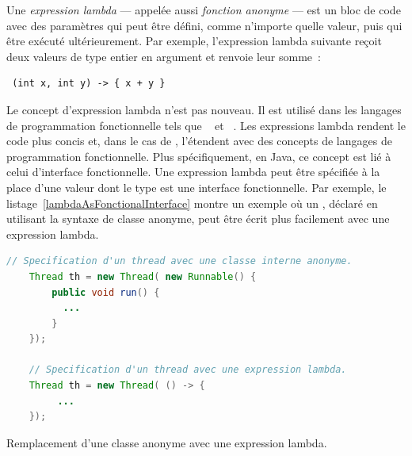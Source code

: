 Une \emph{expression lambda} ---  appel\'ee aussi \emph{fonction anonyme} --- est un bloc de code avec des param\`etres qui peut \^etre d\'efini, comme n'importe quelle valeur, puis qui \^etre ex\'ecut\'e ult\'erieurement. Par exemple, l'expression lambda suivante re\c{c}oit deux valeurs de type entier en argument et renvoie leur somme~:
{\small
\begin{lstlisting}
 (int x, int y) -> { x + y }
\end{lstlisting}
} 




Le concept d'expression lambda n'est pas nouveau. Il est utilis\'e dans les langages de programmation fonctionnelle tels que ~\citep{hutton2016programming} et ~\citep{steele1990common}. 
%
Les expressions lambda rendent le code plus concis et, dans le cas de , l'\'etendent avec des concepts de langages de programmation fonctionnelle. 
%
Plus sp\'ecifiquement, en Java, ce concept est li\'e \`a celui d'interface fonctionnelle. Une expression lambda peut \^etre sp\'ecifi\'ee \`a la place d'une valeur dont le type est une interface fonctionnelle. Par exemple, le listage~\ref{lambdaAsFonctionalInterface} montre un exemple o\`u un , d\'eclar\'e en utilisant la syntaxe de classe anonyme, peut \^etre \'ecrit plus facilement avec une expression lambda.

\begin{Listing}[tbp]
\begin{lstlisting}[language=java]
    // Specification d'un thread avec une classe interne anonyme.
	Thread th = new Thread( new Runnable() {
		public void run() {
          ...
		}
	});

    // Specification d'un thread avec une expression lambda.
	Thread th = new Thread( () -> {
         ...
	});
\end{lstlisting}
\caption{Remplacement d'une classe anonyme avec une expression lambda.}
\label{lambdaAsFonctionalInterface}
\end{Listing}

